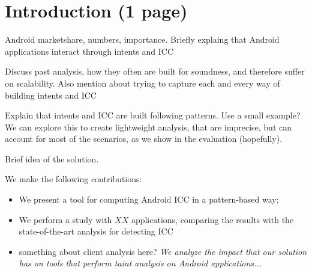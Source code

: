 \section{Introduction (1 page)}

Android marketshare, numbers, importance. 
Briefly explaing that Android applications interact through intents and ICC

Discuss past analysis, how they often are built for soundness, and therefore suffer on scalability. Also mention about trying to capture each and every way of building intents and ICC

Explain that intents and ICC are built following patterns. Use a small
example? We can explore this to create lightweight analysis, that are imprecise, but can account for most of the scenarios, as we show in the evaluation (hopefully). 

Brief idea of the solution. 

We make the following contributions:
\begin{itemize}
 \item We present a tool for computing Android ICC in a pattern-based way;
 \item We perform a study with $XX$ applications, comparing the results with the state-of-the-art analysis for detecting ICC~\cite{epicc,iccta,comdroid}
 \item something about client analysis here? \emph{We analyze the impact that our solution has on tools that perform taint analysis on Android applications...}
\end{itemize}


